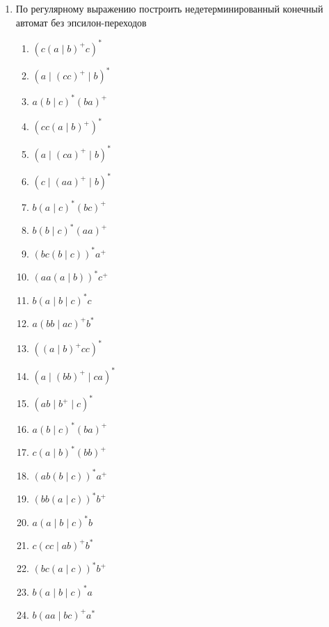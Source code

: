 \documentclass[12pt]{article}
\begin{document}
\begin{enumerate}
  \item По регулярному выражению построить недетерминированный конечный автомат без эпсилон-переходов
  \begin{enumerate}[label=\arabic*)]
    \setlength\itemsep{0.8em}
    \item $(c (a \mid b)^+ c)^*$
    \item $(a \mid (cc)^+ \mid b)^*$
    \item $a (b \mid c)^* (ba)^+$
    \item $(c c (a \mid b)^+)^*$
    \item $(a \mid (ca)^+ \mid b)^*$
    \item $(c \mid (aa)^+ \mid b)^*$
    \item $b (a \mid c)^* (bc)^+$
    \item $b (b \mid c)^* (aa)^+$
    \item $(bc (b \mid c))^* a^+$
    \item $(aa (a \mid b))^* c^+$
    \item $b (a \mid b \mid c)^* c$
    \item $a (bb \mid ac)^+ b^*$
    \item $((a \mid b)^+ c c)^*$
    \item $(a \mid (bb)^+ \mid ca)^*$
    \item $(ab \mid b^+ \mid c)^*$
    \item $a (b \mid c)^* (ba)^+$
    \item $c (a \mid b)^* (bb)^+$
    \item $(ab (b \mid c))^* a^+$
    \item $(bb (a \mid c))^* b^+$
    \item $a (a \mid b \mid c)^* b$
    \item $c (cc \mid ab)^+ b^*$
    \item $(bc (a \mid c))^* b^+$
    \item $b (a \mid b \mid c)^* a$
    \item $b (aa \mid bc)^+ a^*$
  \end{enumerate}
\end{enumerate}
\end{document}
